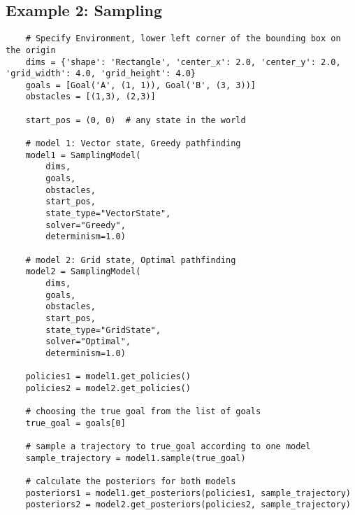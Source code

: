 \subsection{Example 2: Sampling}\label{appendix:ex_sampling}

\begin{verbatim}
	# Specify Environment, lower left corner of the bounding box on the origin
	dims = {'shape': 'Rectangle', 'center_x': 2.0, 'center_y': 2.0, 'grid_width': 4.0, 'grid_height': 4.0}
	goals = [Goal('A', (1, 1)), Goal('B', (3, 3))]
	obstacles = [(1,3), (2,3)]
	
	start_pos = (0, 0)  # any state in the world
	
	# model 1: Vector state, Greedy pathfinding
	model1 = SamplingModel(
		dims,
		goals, 
		obstacles, 
		start_pos, 
		state_type="VectorState", 
		solver="Greedy", 
		determinism=1.0)
	
	# model 2: Grid state, Optimal pathfinding
	model2 = SamplingModel(
		dims, 
		goals, 
		obstacles, 
		start_pos, 
		state_type="GridState", 
		solver="Optimal", 
		determinism=1.0)
	
	policies1 = model1.get_policies()
	policies2 = model2.get_policies()
	
	# choosing the true goal from the list of goals
	true_goal = goals[0]
	
	# sample a trajectory to true_goal according to one model
	sample_trajectory = model1.sample(true_goal)
	
	# calculate the posteriors for both models
	posteriors1 = model1.get_posteriors(policies1, sample_trajectory)
	posteriors2 = model2.get_posteriors(policies2, sample_trajectory)
\end{verbatim}
